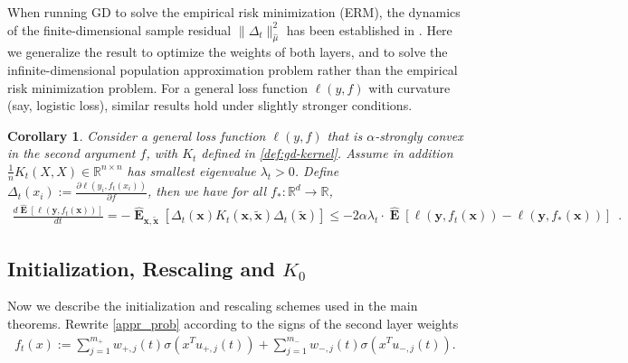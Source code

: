 \documentclass[11pt]{article}
\numberwithin{equation}{section}
\newtheorem{corollary}{Corollary}[section]
\def\E{\mathop{\mathbf{E}}}
\def\bd#1{\mathbf{#1}}
\def\bx{\bd{x}}
\def\by{\bd{y}}
\begin{document}
When running GD to solve the empirical risk minimization (ERM), the dynamics of the finite-dimensional sample residual $\| \Delta_t \|_{\hat{\mu}}^2 $ has been established in \cite{jacot2018neural,du2018gradient}. Here we generalize the result to optimize the weights of both layers, and to solve the infinite-dimensional population approximation problem rather than the empirical risk minimization problem.
For a general loss function $\ell(y, f)$ with curvature (say, logistic loss), similar results hold under slightly stronger conditions.
\begin{corollary}
            \label{cor:general-loss}
            Consider a general loss function $\ell(y, f)$ that is $\alpha$-strongly convex in the second argument $f$, with $K_t$ defined in \eqref{def:gd-kernel}. Assume in addition $\frac{1}{n}K_t(X, X) \in \mathbb{R}^{n \times n}$ has smallest eigenvalue $\lambda_t > 0$. Define $\Delta_t(x_i) := \frac{\partial \ell(y_i,f_t(x_i))}{\partial f}$, then we have for all $f_* : \mathbb{R}^d \rightarrow \mathbb{R}$,  
             \begin{align*}
                         \frac{d \widehat{\E} \left[\ell(\by, f_t(\bx))\right]}{dt} =  -\widehat{\E}_{\bd{x}, \bd{\tilde x}}\left[ \Delta_t(\bd{x})K_t(\bd{x}, \bd{\tilde x})\Delta_t(\bd{\tilde x})\right] \leq - 2\alpha\lambda_t \cdot \widehat{\E} \left[\ell(\by, f_t(\bx)) - \ell(\by, f_*(\bx))\right] \enspace.
              \end{align*} 
\end{corollary}

        
        
        
        
        
\subsection{Initialization, Rescaling and $K_0$}
\label{sec:K0}

Now we describe the initialization and rescaling schemes used in the main theorems. 
Rewrite \eqref{appr_prob} according to the signs of the second layer weights
\begin{align*}
    f_t(x) := \sum_{j=1}^{m_{+}} w_{+,j}(t)\sigma(x^T u_{+,j}(t)) + \sum_{j=1}^{m_{-}}w_{-,j}(t)\sigma(x^T u_{-,j}(t)).
\end{align*}
\end{document}
